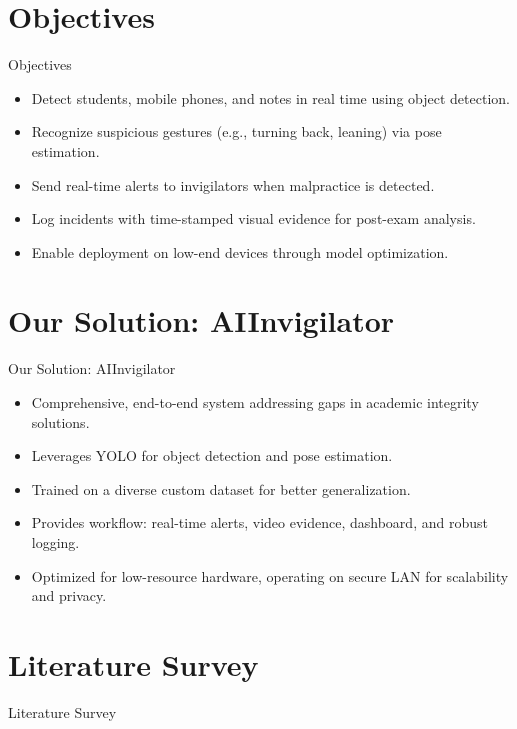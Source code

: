 \documentclass{beamer}
\begin{document}
\section{Objectives}
\begin{frame}{Objectives}
\begin{itemize}
  \item Detect students, mobile phones, and notes in real time using object detection.
  \item Recognize suspicious gestures (e.g., turning back, leaning) via pose estimation.
  \item Send real-time alerts to invigilators when malpractice is detected.
  \item Log incidents with time-stamped visual evidence for post-exam analysis.
  \item Enable deployment on low-end devices through model optimization.
\end{itemize}
\end{frame}

\section{Our Solution: AIInvigilator}
\begin{frame}{Our Solution: AIInvigilator}
\begin{itemize}
  \item Comprehensive, end-to-end system addressing gaps in academic integrity solutions.
  \item Leverages YOLO for object detection and pose estimation.
  \item Trained on a diverse custom dataset for better generalization.
  \item Provides workflow: real-time alerts, video evidence, dashboard, and robust logging.
  \item Optimized for low-resource hardware, operating on secure LAN for scalability and privacy.
\end{itemize}
\end{frame}

\section{Literature Survey}
\begin{frame}{}
    \centering
    \Huge Literature Survey
\end{frame}
\end{document}
